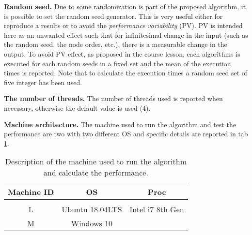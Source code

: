\documentclass[10pt, english, openany]{report}
\begin{document}
\begin{appendices}
			\textbf{Random seed.} Due to some randomization is part of the proposed algorithm, it is possible to set the random seed generator. This is very useful either for reproduce a results or to avoid the \textit{performance variability} (PV). PV is intended here as an unwanted effect such that for infinitesimal change in the input (such as the random seed, the node order, etc.), there is a measurable change in the output. To avoid PV effect, as proposed in the course lesson, each algorithms is executed for each random seeds in a fixed set and the mean of the execution times is reported. Note that to calculate the execution times a random seed set of five integer has been used.
			
			\textbf{The number of threads.} The number of threads used is reported when necessary, otherwise the default value is used (4).
			
			\textbf{Machine architecture.} The machine used to run the algorithm and test the performance are two with two different OS and specific details are reported in tab \ref{tab:machines}.
			\begin{table}[h]
				\begin{center}
					\caption{Description of the machine used to run the algorithm and calculate the performance.}
					\label{tab:machines}
					\begin{tabular}{ccc}
						Machine ID  & OS 				&	 Proc 			\\ \hline \\
						L 			& Ubuntu 18.04LTS 	& Intel i7 8th Gen 	\\
						M 			& Windows 10 		& 					\\
					\end{tabular}
				\end{center}
			\end{table}
	\end{appendices}
	

	
	
\end{document}
